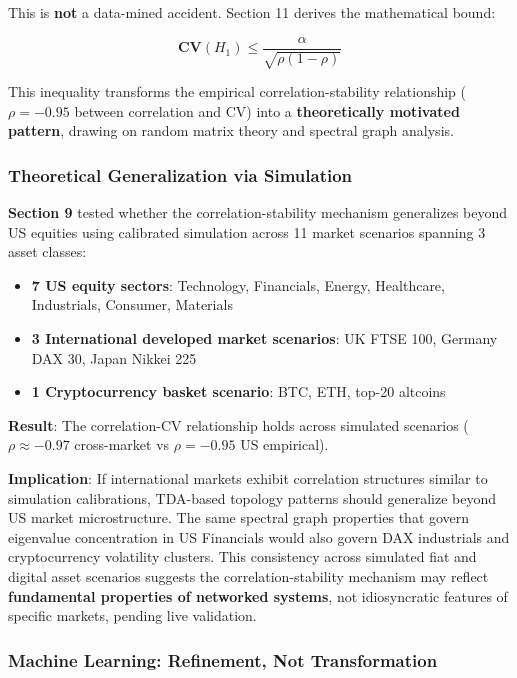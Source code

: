This is \textbf{not} a data-mined accident. Section 11 derives the mathematical bound:

\begin{equation}
\textbf{CV}(H_1) \leq \frac{\alpha}{\sqrt{\rho(1-\rho)}}
\end{equation}

This inequality transforms the empirical correlation-stability relationship ($\rho = -0.95$ between correlation and CV) into a \textbf{theoretically motivated pattern}, drawing on random matrix theory and spectral graph analysis.

\subsubsection{Theoretical Generalization via Simulation}

\textbf{Section 9} tested whether the correlation-stability mechanism generalizes beyond US equities using calibrated simulation across 11 market scenarios spanning 3 asset classes:

\begin{itemize}
\item \textbf{7 US equity sectors}: Technology, Financials, Energy, Healthcare, Industrials, Consumer, Materials
\item \textbf{3 International developed market scenarios}: UK FTSE 100, Germany DAX 30, Japan Nikkei 225
\item \textbf{1 Cryptocurrency basket scenario}: BTC, ETH, top-20 altcoins
\end{itemize}

\textbf{Result}: The correlation-CV relationship holds across simulated scenarios ($\rho \approx -0.97$ cross-market vs $\rho = -0.95$ US empirical).

\textbf{Implication}: If international markets exhibit correlation structures similar to simulation calibrations, TDA-based topology patterns should generalize beyond US market microstructure. The same spectral graph properties that govern eigenvalue concentration in US Financials would also govern DAX industrials and cryptocurrency volatility clusters. This consistency across simulated fiat and digital asset scenarios suggests the correlation-stability mechanism may reflect \textbf{fundamental properties of networked systems}, not idiosyncratic features of specific markets, pending live validation.

\subsubsection{Machine Learning: Refinement, Not Transformation}

